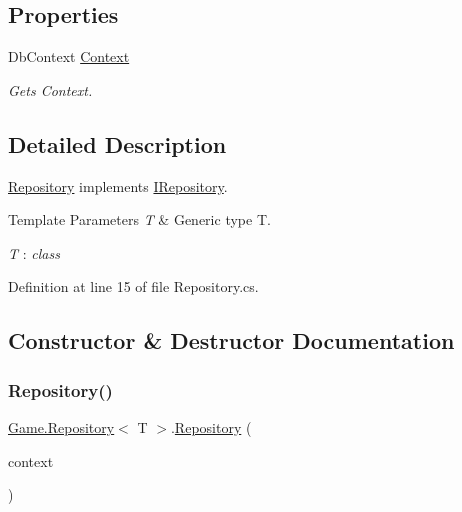 \subsection*{Properties}
\begin{DoxyCompactItemize}
\item 
Db\+Context \mbox{\hyperlink{class_game_1_1_repository_a3cc410e05f93e5ccfb3fb3430b2898cb}{Context}}
\begin{DoxyCompactList}\small\item\em Gets Context. \end{DoxyCompactList}\end{DoxyCompactItemize}


\subsection{Detailed Description}
\mbox{\hyperlink{class_game_1_1_repository}{Repository}} implements \mbox{\hyperlink{interface_game_1_1_i_repository}{I\+Repository}}. 


\begin{DoxyTemplParams}{Template Parameters}
{\em T} & Generic type T.\\
\hline
\end{DoxyTemplParams}
\begin{Desc}
\item[Type Constraints]\begin{description}
\item[{\em T} : {\em class}]\end{description}
\end{Desc}


Definition at line 15 of file Repository.\+cs.



\subsection{Constructor \& Destructor Documentation}
\mbox{\label{class_game_1_1_repository_a4e05519fae5c877e6903dcd1c9c1994a}} 
\subsubsection{\texorpdfstring{Repository()}{Repository()}}
{\footnotesize\ttfamily \mbox{\hyperlink{class_game_1_1_repository}{Game.\+Repository}}$<$ T $>$.\mbox{\hyperlink{class_game_1_1_repository}{Repository}} (\begin{DoxyParamCaption}\item[{Db\+Context}]{context }\end{DoxyParamCaption})}



